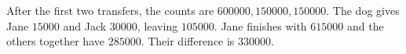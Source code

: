 After the first two transfers, the counts are $600000,150000,150000$. The dog gives Jane $15000$ and Jack $30000$, leaving $105000$. Jane finishes with $615000$ and the others together have $285000$. Their difference is $\boxed{330000}$.
